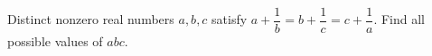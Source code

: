 Distinct nonzero real numbers $a,b,c$ satisfy $a+\dfrac{1}{b}=b+\dfrac{1}{c}=c+\dfrac{1}{a}$. Find all possible values of $abc$.
